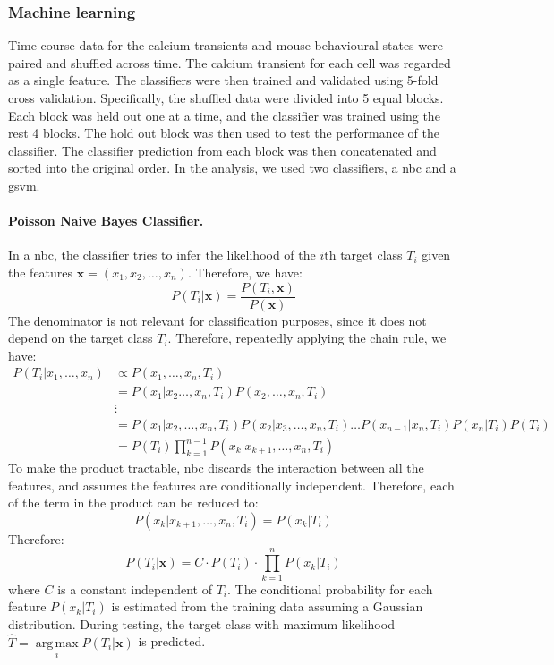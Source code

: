 \subsubsection{Machine learning}

Time-course data for the calcium transients and mouse behavioural states were paired and shuffled across time. The calcium transient for each cell was regarded as a single feature. The classifiers were then trained and validated using 5-fold cross validation. Specifically, the shuffled data were divided into 5 equal blocks. Each block was held out one at a time, and the classifier was trained using the rest 4 blocks. The hold out block was then used to test the performance of the classifier. The classifier prediction from each block was then concatenated and sorted into the original order. In the analysis, we used two classifiers, a \gls{nbc} and a \gls{gsvm}. 

\paragraph{Poisson Naive Bayes Classifier.}
In a \gls{nbc}, the classifier tries to infer the likelihood of the $i$th target class $T_i$ given the features $\mathbf{x} = (x_1, x_2, \dots, x_n)$. Therefore, we have:
\begin{equation*}
    P(T_i|\mathbf{x}) = \frac{P(T_i, \mathbf{x})}{P(\mathbf{x})}
\end{equation*}
The denominator is not relevant for classification purposes, since it does not depend on the target class $T_i$. Therefore, repeatedly applying the chain rule, we have:
\begin{align*}
    P(T_i|x_1, \dots, x_n) &\propto P(x_1, \dots, x_n, T_i) \\
                           &= P(x_1|x_2 \dots, x_n, T_i) P(x_2, \dots, x_n, T_i) \\
                           &\vdots \\
                           &= P(x_1|x_2, \dots, x_n, T_i)  P(x_2|x_3, \dots, x_n, T_i) \ldots  P(x_{n-1}|x_n, T_i)  P(x_n|T_i)  P(T_i) \\
                           &= P(T_i)  \prod_{k=1}^{n-1} P(x_k|x_{k+1}, \dots, x_n, T_i)
\end{align*}
To make the product tractable, \gls{nbc} discards the interaction between all the features, and assumes the features are conditionally independent. Therefore, each of the term in the product can be reduced to:
\begin{equation*}
    P(x_k|x_{k+1}, \dots, x_n, T_i) = P(x_k|T_i)
\end{equation*}
Therefore:
\begin{equation*}
    P(T_i|\mathbf{x}) = C\cdot P(T_i) \cdot \prod_{k=1}^n P(x_k|T_i)
\end{equation*}
where $C$ is a constant independent of $T_i$. The conditional probability for each feature $P(x_k|T_i)$ is estimated from the training data assuming a Gaussian distribution. During testing, the target class with maximum likelihood $\hat{T}=\underset{i}{\operatorname{arg\,max}} P(T_i|\mathbf{x})$ is predicted.

